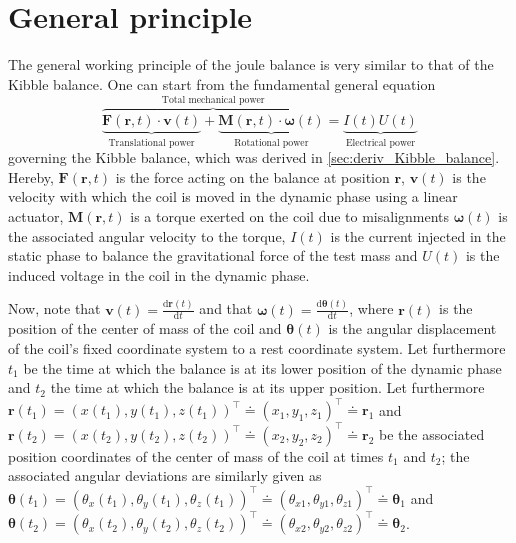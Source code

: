 \documentclass{report}
\numberwithin{tm}{section}
\newcommand\vect[1]{\ensuremath{\bm{#1}}}
\begin{document}
\section{General principle}
The general working principle of the joule balance is very similar to that of the Kibble balance. One can start from the fundamental general equation 
\begin{equation}\label{eq:joulebalancestart}
	\overbrace{\underbrace{\vect{F}(\vect{r},t)\cdot \vect{v}(t)}_{\text{Translational power}} + \underbrace{\vect{M}(\vect{r},t)\cdot \vect{\omega}(t)}_{\text{Rotational power}}}^\text{Total mechanical power} = \underbrace{I(t) U(t)}_{\text{Electrical power}}
\end{equation}
governing the Kibble balance, which was derived in \cref{sec:deriv_Kibble_balance}. Hereby, $\vect{F}(\vect{r},t)$ is the force acting on the balance at position $\vect{r}$, $\vect{v}(t)$ is the velocity with which the coil is moved in the dynamic phase using a linear actuator, $\vect{M}(\vect{r},t)$ is a torque exerted on the coil due to misalignments $\vect{\omega}(t)$ is the associated angular velocity to the torque, $I(t)$ is the current injected in the static phase to balance the gravitational force of the test mass and $U(t)$ is the induced voltage in the coil in the dynamic phase.

Now, note that $\vect{v}(t) = \frac{\mathrm{d}\vect{r}(t)}{\mathrm{d}t}$ and that $\vect{\omega}(t) = \frac{\mathrm{d}\vect{\theta}(t)}{\mathrm{d}t}$, where $\vect{r}(t)$ is the position of the center of mass of the coil and $\vect{\theta}(t)$ is the angular displacement of the coil's fixed coordinate system to a rest coordinate system. Let furthermore $t_1$ be the time at which the balance is at its lower position of the dynamic phase and $t_2$ the time at which the balance is at its upper position. Let furthermore $\vect{r}(t_1) = (x(t_1), y(t_1), z(t_1))^\top \doteq (x_1, y_1, z_1)^\top \doteq \vect{r}_1$ and $\vect{r}(t_2) = (x(t_2), y(t_2), z(t_2))^\top \doteq (x_2, y_2, z_2)^\top \doteq \vect{r}_2$ be the associated position coordinates of the center of mass of the coil at times $t_1$ and $t_2$; the associated angular deviations are similarly given as $\vect{\theta}(t_1) = (\theta_x(t_1), \theta_y(t_1), \theta_z(t_1))^\top \doteq (\theta_{x1}, \theta_{y1}, \theta_{z1})^\top \doteq \vect{\theta}_1$ and  $\vect{\theta}(t_2) = (\theta_x(t_2), \theta_y(t_2), \theta_z(t_2))^\top \doteq (\theta_{x2}, \theta_{y2}, \theta_{z2})^\top \doteq \vect{\theta}_2$.
\end{document}
